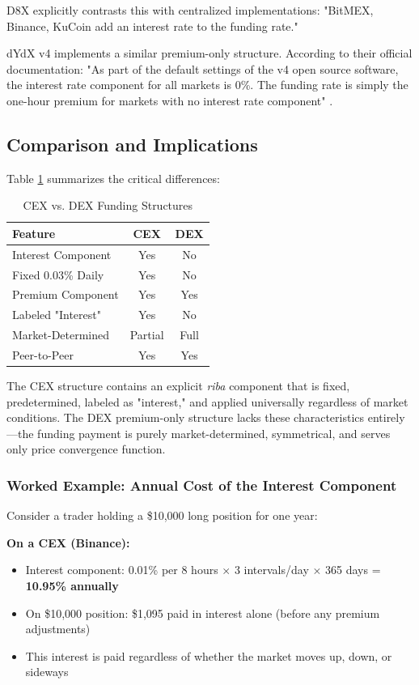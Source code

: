 \documentclass[10pt,twocolumn]{article}
\begin{document}
D8X explicitly contrasts this with centralized implementations: "BitMEX, Binance, KuCoin add an interest rate to the funding rate."

dYdX v4 implements a similar premium-only structure. According to their official documentation: "As part of the default settings of the v4 open source software, the interest rate component for all markets is 0\%. The funding rate is simply the one-hour premium for markets with no interest rate component" \citep{dYdX2024}.

\subsection{Comparison and Implications}

Table \ref{tab:comparison} summarizes the critical differences:

\begin{table}[h]
\centering
\small
\begin{tabular}{@{}lcc@{}}
\toprule
\textbf{Feature} & \textbf{CEX} & \textbf{DEX} \\ 
\midrule
Interest Component & Yes & No \\
Fixed 0.03\% Daily & Yes & No \\
Premium Component & Yes & Yes \\
Labeled "Interest" & Yes & No \\
Market-Determined & Partial & Full \\
Peer-to-Peer & Yes & Yes \\
\bottomrule
\end{tabular}
\caption{CEX vs. DEX Funding Structures}
\label{tab:comparison}
\end{table}

The CEX structure contains an explicit \textit{riba} component that is fixed, predetermined, labeled as "interest," and applied universally regardless of market conditions. The DEX premium-only structure lacks these characteristics entirely—the funding payment is purely market-determined, symmetrical, and serves only price convergence function.

\subsubsection{Worked Example: Annual Cost of the Interest Component}

Consider a trader holding a \$10,000 long position for one year:

\textbf{On a CEX (Binance):}
\begin{itemize}
    \item Interest component: 0.01\% per 8 hours $\times$ 3 intervals/day $\times$ 365 days = \textbf{10.95\% annually}
    \item On \$10,000 position: \$1,095 paid in interest alone (before any premium adjustments)
    \item This interest is paid regardless of whether the market moves up, down, or sideways
\end{itemize}
\end{document}
